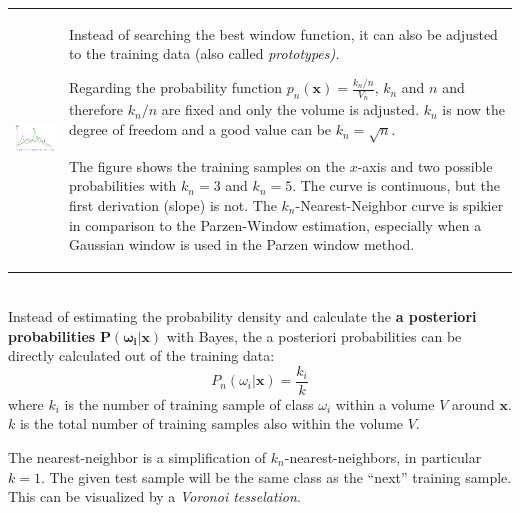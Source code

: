   
    \begin{tabular}{ll}
      \parbox{7cm}{
        \includegraphics[width=6cm]{./images/k-nearest-neighbor.jpg}
          }
        & \parbox{11cm}{
          Instead of searching the best window function, it can also be adjusted to the training data 
          (also called \em prototypes\em).
          
          Regarding the probability function $p_n(\bm{x}) = \frac{k_n/n}{V_n}$, $k_n$ and $n$
          and therefore $k_n/n$ are fixed and only the volume is adjusted. $k_n$ is now the degree 
          of freedom and a good value can be $k_n = \sqrt{n}$.
          
          The figure shows the training samples on the $x$-axis and two possible probabilities
          with $k_n=3$ and $k_n=5$. The curve is continuous, but the first derivation (slope) is not. 
          The $k_n$-Nearest-Neighbor curve is spikier in comparison to the Parzen-Window estimation, especially when a Gaussian window is used 
          in the Parzen window method.
          }
    \end{tabular} 
    \vspace{3mm}\\
    Instead of estimating the probability density and calculate the \textbf{a posteriori probabilities} $\bm {P(\omega_i | \bm x)}$ with Bayes, the a posteriori 
    probabilities can be directly calculated out of the training data:\\
    $$ P_n(\omega_i|\bm x)=\frac{k_i}{k}$$
    where $k_i$ is the number of training sample of class $\omega_i$ within a volume $V$ around $\bm x$.
    $k$ is the total number of training samples also within the volume $V$.
  
  
  	The nearest-neighbor is a simplification of $k_n$-nearest-neighbors, in particular $k=1$. 
  	The given test sample will be the same class as the ``next'' training sample.
  	This can be visualized by a \emph{Voronoi tesselation}.
  	
